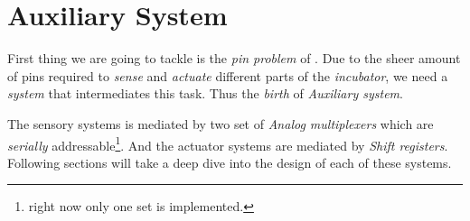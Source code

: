 \documentclass[../main]{subfiles}
\begin{document}
\chapter{Auxiliary System} \label{chp:auxiliarySystem}

First thing we are going to tackle is the \emph{pin problem} of \esp. Due to
the sheer amount of pins required to \emph{sense} and \emph{actuate} different
parts of the \emph{incubator}, we need a \emph{system} that intermediates this
task. Thus the \emph{birth} of \emph{Auxiliary system}.

The sensory systems is mediated by two set of \emph{Analog multiplexers} which are
\emph{serially} addressable\footnote{right now only one set is implemented.}. And the
actuator systems are mediated by \emph{Shift registers}. Following sections will
take a deep dive into the design of each of these systems.








\end{document}
